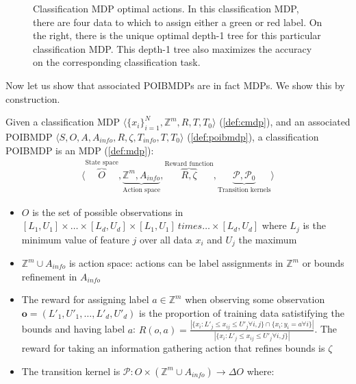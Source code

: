 \begin{figure}[h]
    \caption{Classification MDP optimal actions. In this classification MDP, there are four data to which to assign either a green or red label.
    On the right, there is the unique optimal depth-1 tree for this particular classification MDP. This depth-1 tree also maximizes the accuracy on the corresponding classification task.}\label{example:cmdp}
    \end{figure}

Now let us show that associated POIBMDPs are in fact MDPs. We show this by construction.

\begin{definition}
    Given a classification MDP $\langle {\{x_i\}}_{i=1}^N, \mathbb{Z}^m, R, T, T_0 \rangle$ (\ref{def:cmdp}), and an associated POIBMDP $\langle S, O, A, A_{info}, R, \zeta, T_{info}, T, T_0\rangle$ (\ref{def:poibmdp}), a classification POIBMDP is an MDP (\ref{def:mdp}):
    \begin{align*}
        \langle \overbrace{O}^{\text{State space}}, \underbrace{\mathbb{Z}^m, A_{info}}_{\text{Action space}}, \overbrace{R, \zeta}^{\text{Reward function}}, \underbrace{\mathcal{P}, \mathcal{P}_0}_{\text{Transition kernels}} \rangle
    \end{align*}
    \begin{itemize}
        \item $O$ is the set of possible observations in $[L_1, U_1] \times \dots \times [L_d, U_d] \times [L_1, U_1] \ times \dots \times [L_d, U_d] $ where $L_j$ is the minimum value of feature $j$ over all data $x_i$ and $U_j$ the maximum
        \item $\mathbb{Z}^m \cup A_{info}$ is action space: actions can be label assignments in $\mathbb{Z}^m$ or bounds refinement in $A_{info}$
        \item The reward for assigning label $a\in \mathbb{Z}^m$ when observing some observation $\boldsymbol{o}=(L'_1, U'_1, \dots, L'_d, U'_d)$ is the proportion of training data satistifying the bounds and having label $a$: $R(o, a) = \frac{|\{x_i: L'_j \leq x_{ij} \leq U'_j \forall i,j \} \cap \{x_i: y_i = a \forall i \}|}{|\{x_i: L'_j \leq x_{ij} \leq U'_j \forall i,j \}|}$. 
        The reward for taking an information gathering action that refines bounds is $\zeta$
        \item The transition kernel is $\mathcal{P}:O \times (\mathbb{Z}^m \cup A_{info}) \rightarrow \Delta O$ where:

\end{itemize}
\end{definition}
